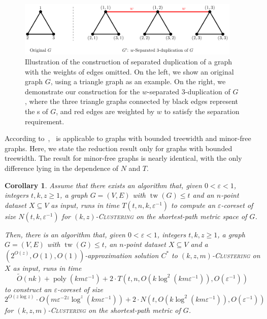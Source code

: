 \documentclass[letterpaper,11pt]{article}
\theoremstyle{plain}
\newtheorem{corollary}[theorem]{Corollary}
\theoremstyle{definition}
\theoremstyle{remark}
\DeclareMathOperator{\poly}{poly}
\DeclareMathOperator{\tw}{tw}
\newcommand{\eps}{\varepsilon}
\newcommand{\ProblemName}[1]{\textsc{#1}}
\newcommand{\kzC}{\ProblemName{$(k,z)$-Clustering}\xspace}
\newcommand{\kzmC}{\ProblemName{$(k,z,m)$-Clustering}\xspace}
\begin{document}
\begin{appendices}
\begin{figure}[t]
	\centering
	\includegraphics[width=0.95\textwidth]{fig/1.pdf}	
	\caption{
        Illustration of the construction of separated duplication of a graph with the weights of edges omitted. On the left, we show an original graph $G$, using a triangle graph as an example. On the right, we demonstrate our construction for the $w$-separated $3$-duplication of $G$, where the three triangle graphs connected by black edges represent the s of $G$, and red edges are weighted by $w$ to satisfy the separation requirement.    
	}
	\label{fig:SeparatedDuplication}
	
\end{figure}

According to~,~ is applicable to graphs with bounded treewidth and minor-free graphs. Here, we state the reduction result only for graphs with bounded treewidth. 
The result for minor-free graphs is nearly identical, with the only difference lying in the dependence of $N$ and $T$.

\begin{corollary}
    \label{cor:treewidth}
    Assume that there exists an algorithm that, given $0<\eps<1$, integers $t,k,z\ge 1$, a graph $G=(V,E)$ with $\tw(G)\le t$ and an $n$-point dataset $X\subseteq V$ as input, runs in time $T(t,n,k,\eps^{-1})$ to compute an $\eps$-coreset of size $N(t,k,\eps^{-1})$ for \kzC on the shortest-path metric space of $G$.
    
    Then, there is an algorithm that, given $0<\eps<1$, integers $t,k,z\ge 1$, a graph $G=(V,E)$ with $\tw(G)\le t$, an $n$-point dataset $X\subseteq V$ and a $(2^{O(z)},O(1),O(1))$-approximation solution $C^*$ to \kzmC on $X$ as input, runs in time \begin{equation*}
        \tilde O(nk) + \poly(km\eps^{-1}) + 2\cdot T(t,n,O(k\log^2(km\eps^{-1})),O(\eps^{-1}))
    \end{equation*}
    to construct an $\eps$-coreset of size \begin{equation*}
        2^{O(z\log z)}\cdot O\left(m\eps^{-2z}\log^z(km\eps^{-1})\right) + 2\cdot N\left(t, O(k\log^2(km\eps^{-1})), O(\eps^{-1})\right)
    \end{equation*}
    for \kzmC on the shortest-path metric of $G$.
\end{corollary}      

\end{appendices}
\end{document}
